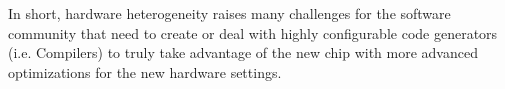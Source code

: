 


 








In short, hardware heterogeneity raises many challenges for the software community that need to create or deal with highly configurable code generators (i.e. Compilers) to truly take advantage of the new chip with more advanced optimizations for the new hardware settings.

